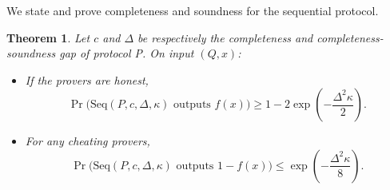 \documentclass[11pt]{article}
\newtheorem{theorem}{Theorem}
\theoremstyle{remark}
\theoremstyle{definition}
\begin{document}
\noindent We state and prove completeness and soundness for the sequential protocol.

\begin{theorem}
Let $c$ and $\Delta$ be respectively the completeness and completeness-soundness gap of protocol P. On input $(Q,x)$:
\begin{itemize}
\item If the provers are honest, $$ \Pr\big(\mbox{Seq}(P, c, \Delta, \kappa) \mbox{  outputs } f(x)\big) \geq 1 - 2\exp \left(-\frac{\Delta^2\kappa}{2}\right) .$$ 
\item For any cheating provers, $$\Pr\big(\mbox{Seq}(P, c, \Delta, \kappa) \mbox{  outputs } 1-f(x)\big) \leq \exp \left(-\frac{\Delta^2\kappa}{8}\right) .$$
\end{itemize}

\end{theorem}
\end{document}
